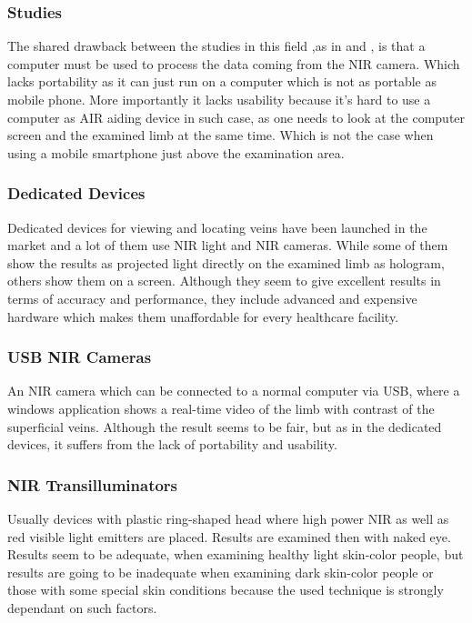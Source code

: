 \subsubsection{Studies}

The shared drawback between the studies in this field ,as in \parencite{study1} and \parencite{study2}, is that a computer must be used to process the data coming
from the NIR camera. Which lacks portability as it can just run on a computer which is not as portable as mobile phone. More importantly it lacks usability because it’s hard to use a
computer as AIR aiding device in such case, as one needs to look at the computer screen
and the examined limb at the same time. Which is not the case when using a mobile
smartphone just above the examination area.

\subsubsection{Dedicated Devices}
Dedicated devices for viewing and locating veins have been launched in the market and a lot of them use NIR light and NIR cameras. While some of them show the results as projected light directly on the examined limb as hologram, others show them on a screen. Although they seem to give excellent results in terms of accuracy and performance, they include advanced and expensive hardware which makes them unaffordable for every healthcare facility.
\subsubsection{USB NIR Cameras}
An NIR camera which can be connected to a normal computer via USB, where a windows application shows a real-time video of the limb with contrast of the superficial veins. Although the result seems to be fair, but as in the dedicated devices, it suffers from the lack of portability and usability.

\subsubsection{NIR Transilluminators}

Usually devices with plastic ring-shaped head where high power NIR as well as red visible light
emitters are placed. Results are examined then with naked eye. Results seem to be adequate,
when examining healthy light skin-color people, but results are going to be inadequate when examining dark skin-color people or those with some special skin conditions because the used technique is strongly dependant on such factors.




 